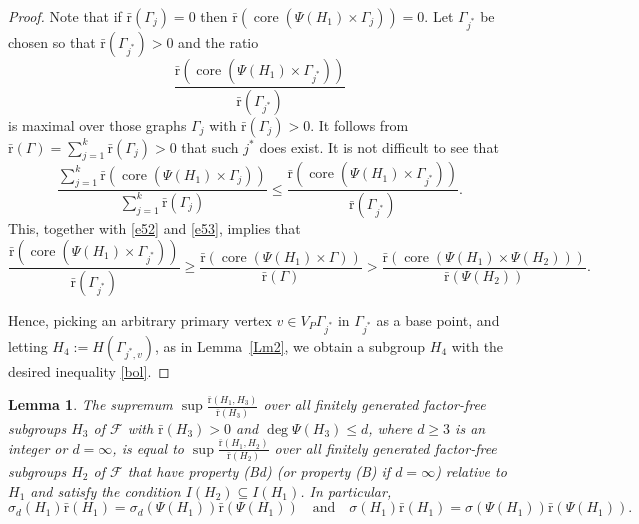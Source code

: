 \documentclass[10pt, reqno]{amsart}
\numberwithin{equation}{section}
\newtheorem{lem}[thm]{Lemma}
\begin{document}
\begin{proof}
Note that if $ {\bar {\mathrm{r}}}(  \Gamma_j )  =0$ then $ {\bar {\mathrm{r}}}( \operatorname{core} (  \Psi(H_1) \times \Gamma_j )) =0$.
Let $\Gamma_{j^*}$ be chosen so that ${\bar {\mathrm{r}}}(\Gamma_{j^*}) >0$ and the ratio
$$
\frac{  {\bar {\mathrm{r}}}( \operatorname{core} ( \Psi(H_1) \times \Gamma_{j^*} )) } {  {\bar {\mathrm{r}}}( \Gamma_{j^*} )      }
$$
is maximal over those graphs $\Gamma_j$ with   $ {\bar {\mathrm{r}}}(  \Gamma_j )  >0$.  It follows from
${\bar {\mathrm{r}}}(\Gamma) = \sum_{j=1}^k {\bar {\mathrm{r}}}(\Gamma_j) >0$ that such $j^*$ does exist.  It is not difficult to see that
$$
 \frac{ \sum_{j=1}^k {\bar {\mathrm{r}}}( \operatorname{core} (  \Psi(H_1) \times \Gamma_j )) }{     \sum_{j=1}^k {\bar {\mathrm{r}}}(  \Gamma_j )      }
  \le     \frac{  {\bar {\mathrm{r}}}( \operatorname{core} ( \Psi(H_1) \times \Gamma_{j^*} )) } {  {\bar {\mathrm{r}}}( \Gamma_{j^*} )      } .
  $$
This, together with \eqref{e52} and \eqref{e53},  implies that
$$
 \frac{  {\bar {\mathrm{r}}}( \operatorname{core} ( \Psi(H_1) \times \Gamma_{j^*} )) } {  {\bar {\mathrm{r}}}( \Gamma_{j^*} )      }  \ge
  \frac{  {\bar {\mathrm{r}}}( \operatorname{core} ( \Psi(H_1) \times \Gamma)) } {  {\bar {\mathrm{r}}}( \Gamma ) } >
  \frac{  {\bar {\mathrm{r}}}( \operatorname{core} ( \Psi(H_1) \times \Psi(H_2))) } {  {\bar {\mathrm{r}}}( \Psi(H_2) ) } .
  $$

Hence, picking an arbitrary
primary vertex $v \in V_P \Gamma_{j^*}$ in $\Gamma_{j^*}$ as a base point, and letting $H_4 := H(\Gamma_{j^*, v})$, as in Lemma~\ref{Lm2}, we obtain a subgroup $H_4$ with the desired inequality \eqref{bol}.
\end{proof}

\begin{lem}\label{lemsup} The supremum  $\sup \frac{ {\bar {\mathrm{r}}}(   H_1, H_3   )  }{  {\bar {\mathrm{r}}}(H_3 ) }$
over all finitely generated factor-free subgroups $H_3$ of  ${\mathcal{F}}$ with  ${\bar {\mathrm{r}}}(H_3 ) >0$ and $\deg  \Psi(H_3) \le d$,
where $d \ge 3$ is an integer or $d = \infty$,
is equal to  $\sup \frac{ {\bar {\mathrm{r}}}(   H_1, H_2   )  }{  {\bar {\mathrm{r}}}(H_2 ) }$
over all finitely generated factor-free subgroups $H_2$ of  ${\mathcal{F}}$ that have  property (Bd) (or property (B) if $d = \infty$) relative to $H_1$ and satisfy the condition $I(H_2) \subseteq I(H_1)$. In particular,
$$
\sigma_d(H_1){\bar {\mathrm{r}}}(H_1 )   = \sigma_d( \Psi(H_1)){\bar {\mathrm{r}}}(\Psi(H_1)) \quad \mbox{and}  \quad
\sigma(H_1){\bar {\mathrm{r}}}(H_1) =  \sigma( \Psi(H_1)) {\bar {\mathrm{r}}}(\Psi(H_1)).
$$
\end{lem}
\end{document}

